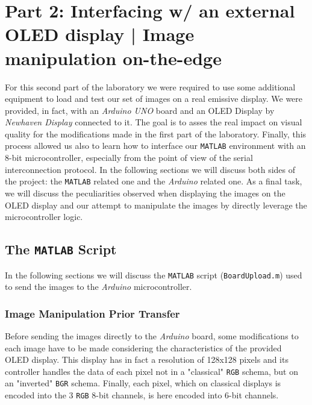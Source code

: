 \documentclass[a4paper]{article}
\begin{document}
%
\section{Part 2: Interfacing w/ an external OLED display | Image manipulation on-the-edge}
    For this second part of the laboratory we were required to use some additional equipment to load and test our set of images on a real emissive display. We were provided, in fact, with an \emph{Arduino UNO} board and an OLED Display by \emph{Newhaven Display} connected to it.
    The goal is to asses the real impact on visual quality for the modifications made in the first part of the laboratory. Finally, this process allowed us also to learn how to interface our \texttt{MATLAB} environment with an 8-bit microcontroller, especially from the point of view of the serial interconnection protocol.
    In the following sections we will discuss both sides of the project: the \texttt{MATLAB} related one and the \emph{Arduino} related one. As a final task, we will discuss the peculiarities observed when displaying the images on the OLED display and our attempt to manipulate the images by directly leverage the microcontroller logic.

    \subsection{The \texttt{MATLAB} Script}
        In the following sections we will discuss the \texttt{MATLAB} script (\texttt{BoardUpload.m}) used to send the images to the \emph{Arduino} microcontroller.

        \subsubsection{Image Manipulation Prior Transfer}
            Before sending the images directly to the \emph{Arduino} board, some modifications to each image have to be made considering the characteristics of the provided OLED display.
            This display has in fact a resolution of 128x128 pixels and its controller handles the data of each pixel not in a "classical" \texttt{RGB} schema, but on an "inverted" \texttt{BGR} schema. Finally, each pixel, which on classical displays is encoded into the 3 \texttt{RGB} 8-bit channels, is here encoded into 6-bit channels.
\end{document}
